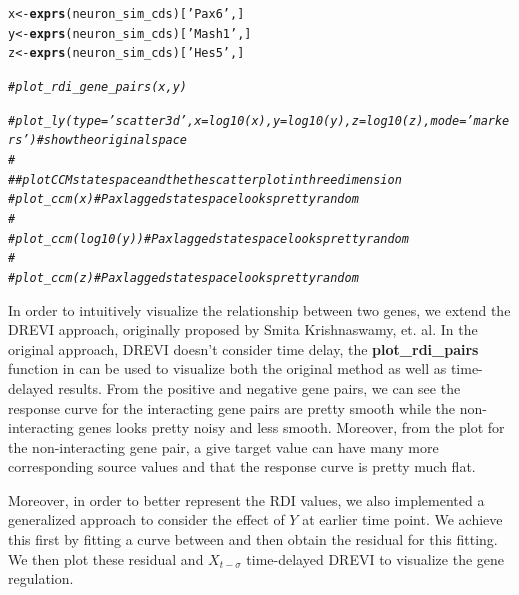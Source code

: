 \documentclass[10pt,oneside]{article}\usepackage[]{graphicx}\usepackage[]{color}
\makeatletter
\newcommand{\hlstr}[1]{\textcolor[rgb]{0.192,0.494,0.8}{#1}}%
\newcommand{\hlcom}[1]{\textcolor[rgb]{0.678,0.584,0.686}{\textit{#1}}}%
\newcommand{\hlstd}[1]{\textcolor[rgb]{0.345,0.345,0.345}{#1}}%
\newcommand{\hlkwb}[1]{\textcolor[rgb]{0.69,0.353,0.396}{#1}}%
\newcommand{\hlkwd}[1]{\textcolor[rgb]{0.737,0.353,0.396}{\textbf{#1}}}%
\newenvironment{kframe}{%
 \def\at@end@of@kframe{}%
 \ifinner\ifhmode%
  \def\at@end@of@kframe{\end{minipage}}%
  \begin{minipage}{\columnwidth}%
 \fi\fi%
 \def\FrameCommand##1{\hskip\@totalleftmargin \hskip-\fboxsep
 \colorbox{shadecolor}{##1}\hskip-\fboxsep
     \hskip-\linewidth \hskip-\@totalleftmargin \hskip\columnwidth}%
 \MakeFramed {\advance\hsize-\width
   \@totalleftmargin\z@ \linewidth\hsize
   \@setminipage}}%
 {\par\unskip\endMakeFramed%
 \at@end@of@kframe}
\newenvironment{knitrout}{}{} %
\makeatother
\begin{document}
\begin{knitrout}
{}


\begin{kframe}\begin{alltt}
\hlstd{x} \hlkwb{<-} \hlkwd{exprs}\hlstd{(neuron_sim_cds)[}\hlstr{'Pax6'}\hlstd{, ]}
\hlstd{y} \hlkwb{<-} \hlkwd{exprs}\hlstd{(neuron_sim_cds)[}\hlstr{'Mash1'}\hlstd{, ]}
\hlstd{z} \hlkwb{<-} \hlkwd{exprs}\hlstd{(neuron_sim_cds)[}\hlstr{'Hes5'}\hlstd{, ]}

\hlcom{# plot_rdi_gene_pairs(x, y)}

\hlcom{# plot_ly(type = 'scatter3d', x = log10(x), y = log10(y), z = log10(z), mode = 'markers') # show the original space}
\hlcom{# }
\hlcom{# # plot CCM state space and the the scatter plot in three dimension}
\hlcom{# plot_ccm(x) # Pax lagged state space looks pretty random}
\hlcom{# }
\hlcom{# plot_ccm(log10(y)) #Pax lagged state space looks pretty random}
\hlcom{# }
\hlcom{# plot_ccm(z) #Pax lagged state space looks pretty random}
\end{alltt}
\end{kframe}
\end{knitrout}

In order to intuitively visualize the relationship between two genes, we extend the DREVI approach, originally proposed by Smita Krishnaswamy, et. al. In the original approach, DREVI doesn't consider time delay, the \textbf{plot\_rdi\_pairs} function in  can be used to visualize both the original  method as well as time-delayed  results. From the positive and negative gene pairs, we can see the response curve for the interacting gene pairs are pretty smooth while the non-interacting genes looks pretty noisy and less smooth. Moreover, from the  plot for the non-interacting gene pair, a give target value can have many more corresponding source values and that the response curve is pretty much flat.

Moreover, in order to better represent the RDI values, we also implemented a generalized approach to consider the effect of $Y$ at earlier time point. We achieve this first by fitting a curve between  and then obtain the residual for this fitting. We then plot these residual and $X_{t - \sigma}$ time-delayed DREVI to visualize the gene regulation.
\end{document}
